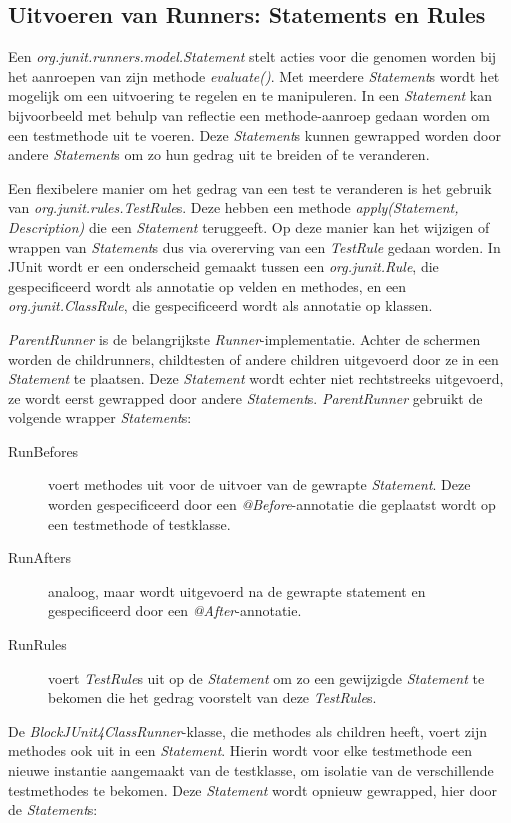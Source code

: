 \documentclass[i1]{oss}
\begin{document}
\subsection{Uitvoeren van Runners: Statements en Rules}

Een \emph{org.junit.runners.model.Statement} stelt acties voor die genomen worden bij het aanroepen van zijn methode \emph{evaluate()}. Met meerdere \emph{Statement}s wordt het mogelijk om een uitvoering te regelen en te manipuleren. In een \emph{Statement} kan bijvoorbeeld met behulp van reflectie een methode-aanroep gedaan worden om een testmethode uit te voeren. Deze \emph{Statement}s kunnen gewrapped worden door andere \emph{Statement}s om zo hun gedrag uit te breiden of te veranderen.

Een flexibelere manier om het gedrag van een test te veranderen is het gebruik van \emph{org.junit.rules.TestRule}s. Deze hebben een methode \emph{apply(Statement, Description)} die een \emph{Statement} teruggeeft. Op deze manier kan het wijzigen of wrappen van \emph{Statement}s dus via overerving van een \emph{TestRule} gedaan worden. In JUnit wordt er een onderscheid gemaakt tussen een \emph{org.junit.Rule}, die gespecificeerd wordt als annotatie op velden en methodes, en een \emph{org.junit.ClassRule}, die gespecificeerd wordt als annotatie op klassen.

\emph{ParentRunner} is de belangrijkste \emph{Runner}-implementatie. Achter de schermen worden de childrunners, childtesten of andere children uitgevoerd door ze in een \emph{Statement} te plaatsen. Deze \emph{Statement} wordt echter niet rechtstreeks uitgevoerd, ze wordt eerst gewrapped door andere \emph{Statement}s. \emph{ParentRunner} gebruikt de volgende wrapper \emph{Statement}s:

\begin{description}
\item[RunBefores] voert methodes uit voor de uitvoer van de gewrapte \emph{Statement}. Deze worden gespecificeerd door een \emph{@Before}-annotatie die geplaatst wordt op een testmethode of testklasse.
\item[RunAfters] analoog, maar wordt uitgevoerd na de gewrapte statement en gespecificeerd door een \emph{@After}-annotatie.
\item[RunRules] voert \emph{TestRule}s uit op de \emph{Statement} om zo een gewijzigde \emph{Statement} te bekomen die het gedrag voorstelt van deze \emph{TestRule}s.
\end{description}

De \emph{BlockJUnit4ClassRunner}-klasse, die methodes als children heeft, voert zijn methodes ook uit in een \emph{Statement}. Hierin wordt voor elke testmethode een nieuwe instantie aangemaakt van de testklasse, om isolatie van de verschillende testmethodes te bekomen. Deze \emph{Statement} wordt opnieuw gewrapped, hier door de \emph{Statement}s:
\end{document}
